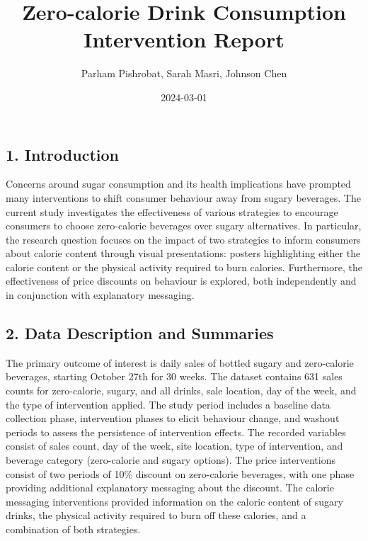 \documentclass[
]{article}
\title{Zero-calorie Drink Consumption Intervention Report}
\author{Parham Pishrobat, Sarah Masri, Johnson Chen}
\date{2024-03-01}
\begin{document}
\maketitle

\hypertarget{introduction}{%
\subsection{1. Introduction}\label{introduction}}

Concerns around sugar consumption and its health implications have
prompted many interventions to shift consumer behaviour away from sugary
beverages. The current study investigates the effectiveness of various
strategies to encourage consumers to choose zero-calorie beverages over
sugary alternatives. In particular, the research question focuses on the
impact of two strategies to inform consumers about calorie content
through visual presentations: posters highlighting either the calorie
content or the physical activity required to burn calories. Furthermore,
the effectiveness of price discounts on behaviour is explored, both
independently and in conjunction with explanatory messaging.

\hypertarget{data-description-and-summaries}{%
\subsection{2. Data Description and
Summaries}\label{data-description-and-summaries}}

The primary outcome of interest is daily sales of bottled sugary and
zero-calorie beverages, starting October 27th for 30 weeks. The dataset
contains 631 sales counts for zero-calorie, sugary, and all drinks, sale
location, day of the week, and the type of intervention applied. The
study period includes a baseline data collection phase, intervention
phases to elicit behaviour change, and washout periods to assess the
persistence of intervention effects. The recorded variables consist of
sales count, day of the week, site location, type of intervention, and
beverage category (zero-calorie and sugary options). The price
interventions consist of two periods of 10\% discount on zero-calorie
beverages, with one phase providing additional explanatory messaging
about the discount. The calorie messaging interventions provided
information on the caloric content of sugary drinks, the physical
activity required to burn off these calories, and a combination of both
strategies.
\end{document}
